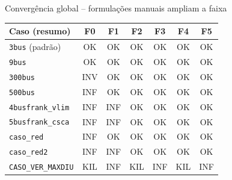 \documentclass{libs/ufc_format}
\begin{document}
\begin{frame}{Convergência global -- formulações manuais ampliam a faixa}
    \footnotesize
    \begin{center}
    \renewcommand{\arraystretch}{1.1}
    \setlength{\tabcolsep}{4pt}
    \begin{tabular}{lcccccc}
        \hline
        \textbf{Caso (resumo)} & \textbf{F0} & \textbf{F1} & \textbf{F2} & \textbf{F3} & \textbf{F4} & \textbf{F5} \\
        \hline
        \texttt{3bus} (padrão)         & \cellcolor{statusok}OK & \cellcolor{statusok}OK & \cellcolor{statusok}OK & \cellcolor{statusok}OK & \cellcolor{statusok}OK & \cellcolor{statusok}OK \\
        \texttt{9bus}                  & \cellcolor{statusok}OK & \cellcolor{statusok}OK & \cellcolor{statusok}OK & \cellcolor{statusok}OK & \cellcolor{statusok}OK & \cellcolor{statusok}OK \\
        \texttt{300bus}                & \cellcolor{statusinv}INV & \cellcolor{statusok}OK & \cellcolor{statusok}OK & \cellcolor{statusok}OK & \cellcolor{statusok}OK & \cellcolor{statusok}OK \\
        \texttt{500bus}                & \cellcolor{statusinf}INF & \cellcolor{statusok}OK & \cellcolor{statusok}OK & \cellcolor{statusok}OK & \cellcolor{statusok}OK & \cellcolor{statusok}OK \\
        \texttt{4busfrank\_vlim}       & \cellcolor{statusinf}INF & \cellcolor{statusinf}INF & \cellcolor{statusok}OK & \cellcolor{statusok}OK & \cellcolor{statusok}OK & \cellcolor{statusok}OK \\
        \texttt{5busfrank\_csca}       & \cellcolor{statusinf}INF & \cellcolor{statusinf}INF & \cellcolor{statusok}OK & \cellcolor{statusok}OK & \cellcolor{statusok}OK & \cellcolor{statusok}OK \\
        \texttt{caso\_red}             & \cellcolor{statusinf}INF & \cellcolor{statusok}OK & \cellcolor{statusok}OK & \cellcolor{statusok}OK & \cellcolor{statusok}OK & \cellcolor{statusok}OK \\
        \texttt{caso\_red2}            & \cellcolor{statusinf}INF & \cellcolor{statusinf}INF & \cellcolor{statusok}OK & \cellcolor{statusok}OK & \cellcolor{statusok}OK & \cellcolor{statusok}OK \\
        \texttt{CASO\_VER\_MAXDIU}      & \cellcolor{statuskil}KIL & \cellcolor{statusinf}INF & \cellcolor{statuskil}KIL & \cellcolor{statusinf}INF & \cellcolor{statuskil}KIL & \cellcolor{statusinf}INF \\
        \hline
    \end{tabular}
    \end{center}

    \vspace{0.2cm}
\end{frame}
\end{document}
